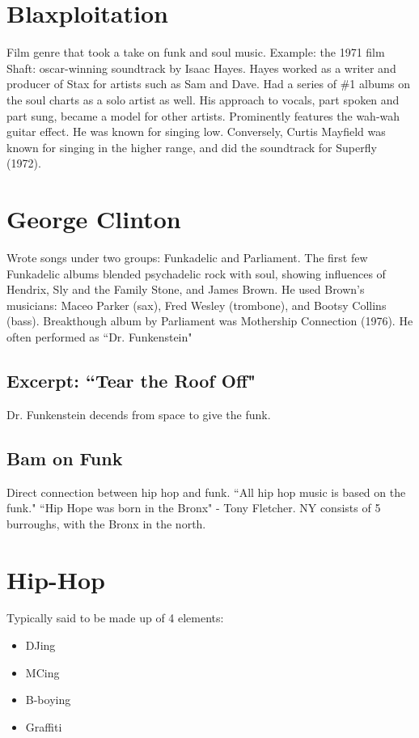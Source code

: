 \documentclass[12pt, a4paper, twoside, openright, titlepage]{book}
\begin{document}
\section{Blaxploitation}

Film genre that took a take on funk and soul music. Example: the 1971 film Shaft: oscar-winning soundtrack by Isaac Hayes. Hayes worked as a writer and producer of Stax for artists such as Sam and Dave. Had a series of \#1 albums on the soul charts as a solo artist as well. His approach to vocals, part spoken and part sung, became a model for other artists. Prominently features the wah-wah guitar effect. He was known for singing low. Conversely, Curtis Mayfield was known for singing in the higher range, and did the soundtrack for Superfly (1972).


\section{George Clinton}

Wrote songs under two groups: Funkadelic and Parliament. The first few Funkadelic albums blended psychadelic rock with soul, showing influences of Hendrix, Sly and the Family Stone, and James Brown. He used Brown's musicians: Maceo Parker (sax), Fred Wesley (trombone), and Bootsy Collins (bass). Breakthough album by Parliament was Mothership Connection (1976). He often performed as ``Dr. Funkenstein"

\subsection{Excerpt: ``Tear the Roof Off"}

Dr. Funkenstein decends from space to give the funk.

\subsection{Bam on Funk}

Direct connection between hip hop and funk. ``All hip hop music is based on the funk." ``Hip Hope was born in the Bronx" - Tony Fletcher. NY consists of 5 burroughs, with the Bronx in the north.


\section{Hip-Hop}


Typically said to be made up of 4 elements: \begin{itemize}
    \item DJing
    \item MCing
    \item B-boying 
    \item Graffiti
\end{itemize}
\end{document}
